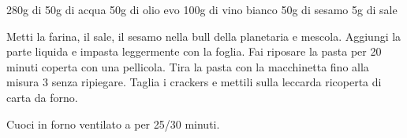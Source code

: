 \begin{ingreds}
	280g di 
	50g di acqua
	50g di olio evo
	100g di vino bianco
	50g di sesamo
	5g di sale
\end{ingreds}

\begin{method}
	Metti la farina, il sale, il sesamo nella bull della planetaria e mescola. Aggiungi la parte liquida e impasta leggermente con la foglia. Fai riposare la pasta per 20 minuti coperta con una pellicola.
	Tira la pasta con la macchinetta fino alla misura 3 senza ripiegare. Taglia i crackers e mettili sulla leccarda ricoperta di carta da forno.

	Cuoci in forno ventilato a  per 25/30 minuti.
\end {method}

